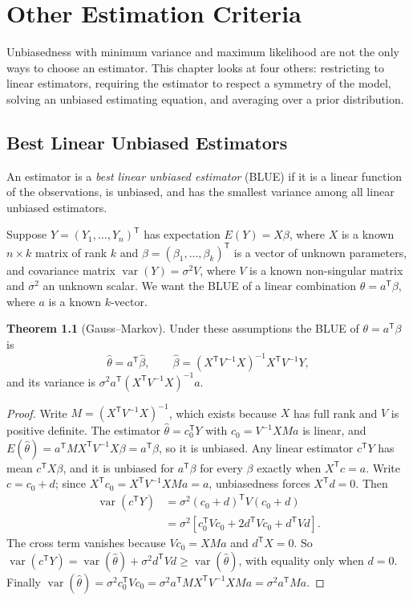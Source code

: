 \documentclass[12pt,a4paper]{report}
\theoremstyle{definition}
\newtheorem{thm}{Theorem}[section]
\DeclareMathOperator{\var}{var}
\begin{document}
\chapter{Other Estimation Criteria}

Unbiasedness with minimum variance and maximum likelihood are not the only ways
to choose an estimator. This chapter looks at four others: restricting to linear
estimators, requiring the estimator to respect a symmetry of the model, solving an
unbiased estimating equation, and averaging over a prior distribution.

\section{Best Linear Unbiased Estimators}

An estimator is a \emph{best linear unbiased estimator} (BLUE) if it is a linear
function of the observations, is unbiased, and has the smallest variance among all
linear unbiased estimators.

Suppose $Y = (Y_1, \dots, Y_n)^{\mathsf T}$ has expectation $E(Y) = X\beta$, where
$X$ is a known $n\times k$ matrix of rank $k$ and $\beta = (\beta_1, \dots, \beta_k)^{\mathsf T}$
is a vector of unknown parameters, and covariance matrix $\var(Y) = \sigma^2V$, where
$V$ is a known non-singular matrix and $\sigma^2$ an unknown scalar. We want the BLUE
of a linear combination $\theta = a^{\mathsf T}\beta$, where $a$ is a known
$k$-vector.

\begin{thm}[Gauss--Markov]
\label{thm:gaussmarkov}
Under these assumptions the BLUE of $\theta = a^{\mathsf T}\beta$ is
\[\hat\theta = a^{\mathsf T}\hat\beta,\qquad
\hat\beta = \left(X^{\mathsf T}V^{-1}X\right)^{-1}X^{\mathsf T}V^{-1}Y,\]
and its variance is $\sigma^2a^{\mathsf T}\left(X^{\mathsf T}V^{-1}X\right)^{-1}a$.
\end{thm}

\begin{proof}
Write $M = \left(X^{\mathsf T}V^{-1}X\right)^{-1}$, which exists because $X$ has full
rank and $V$ is positive definite. The estimator $\hat\theta = c_0^{\mathsf T}Y$ with
$c_0 = V^{-1}XMa$ is linear, and
$E(\hat\theta) = a^{\mathsf T}MX^{\mathsf T}V^{-1}X\beta = a^{\mathsf T}\beta$, so it is
unbiased. Any linear estimator $c^{\mathsf T}Y$ has mean $c^{\mathsf T}X\beta$, and it is
unbiased for $a^{\mathsf T}\beta$ for every $\beta$ exactly when $X^{\mathsf T}c = a$.
Write $c = c_0 + d$; since $X^{\mathsf T}c_0 = X^{\mathsf T}V^{-1}XMa = a$, unbiasedness
forces $X^{\mathsf T}d = 0$. Then
\begin{align*}
\var(c^{\mathsf T}Y) &= \sigma^2(c_0 + d)^{\mathsf T}V(c_0 + d)\\
&= \sigma^2\left[c_0^{\mathsf T}Vc_0 + 2d^{\mathsf T}Vc_0 + d^{\mathsf T}Vd\right].
\end{align*}
The cross term vanishes because $Vc_0 = XMa$ and $d^{\mathsf T}X = 0$. So
$\var(c^{\mathsf T}Y) = \var(\hat\theta) + \sigma^2d^{\mathsf T}Vd\ge\var(\hat\theta)$,
with equality only when $d = 0$. Finally
$\var(\hat\theta) = \sigma^2c_0^{\mathsf T}Vc_0 = \sigma^2a^{\mathsf T}MX^{\mathsf T}V^{-1}XMa = \sigma^2a^{\mathsf T}Ma$.
\end{proof}
\end{document}
